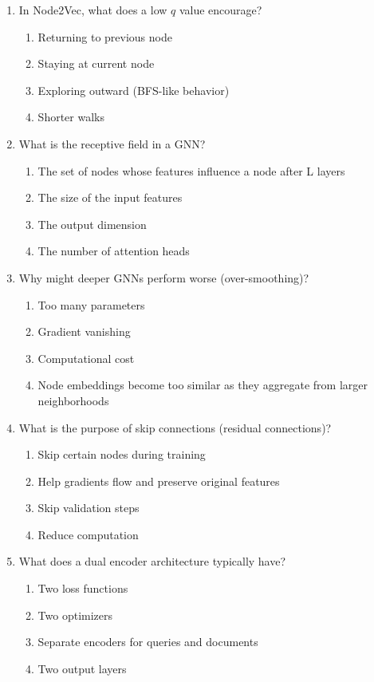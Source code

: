\documentclass[12pt,a4paper]{article}
\begin{document}
\begin{enumerate}
\item In Node2Vec, what does a low $q$ value encourage?
\begin{enumerate}[label=\Alph*)]
    \item Returning to previous node
    \item Staying at current node
    \item Exploring outward (BFS-like behavior)
    \item Shorter walks
\end{enumerate}

\item What is the receptive field in a GNN?
\begin{enumerate}[label=\Alph*)]
    \item The set of nodes whose features influence a node after L layers
    \item The size of the input features
    \item The output dimension
    \item The number of attention heads
\end{enumerate}

\item Why might deeper GNNs perform worse (over-smoothing)?
\begin{enumerate}[label=\Alph*)]
    \item Too many parameters
    \item Gradient vanishing
    \item Computational cost
    \item Node embeddings become too similar as they aggregate from larger neighborhoods
\end{enumerate}

\item What is the purpose of skip connections (residual connections)?
\begin{enumerate}[label=\Alph*)]
    \item Skip certain nodes during training
    \item Help gradients flow and preserve original features
    \item Skip validation steps
    \item Reduce computation
\end{enumerate}

\item What does a dual encoder architecture typically have?
\begin{enumerate}[label=\Alph*)]
    \item Two loss functions
    \item Two optimizers
    \item Separate encoders for queries and documents
    \item Two output layers
\end{enumerate}


\end{enumerate}
\end{document}
